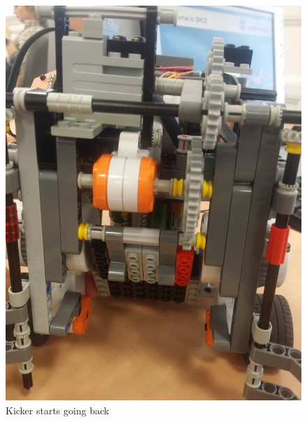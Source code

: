\documentclass[12pt]{article}
\begin{document}
\begin{figure}[ht]
\begin{minipage}[b]{.3\textwidth}
        \centering
		\includegraphics[scale=0.04, angle=-90]{kick_middle.jpg}
		\caption{Kicker starts going back}
		

\end{minipage}
\end{figure}
\end{document}
